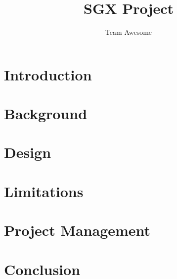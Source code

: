 \documentclass{article}
\title{SGX Project}
\author{Team Awesome}
\begin{document}
\maketitle

\newpage

\begin{abstract}
	
\end{abstract}

\newpage

\tableofcontents

\newpage

\section{Introduction}

\newpage

\section{Background}


\newpage

\section{Design}

\newpage

\section{Limitations}

\newpage

\section{Project Management}

\newpage

\section{Conclusion}

\newpage
\end{document}
